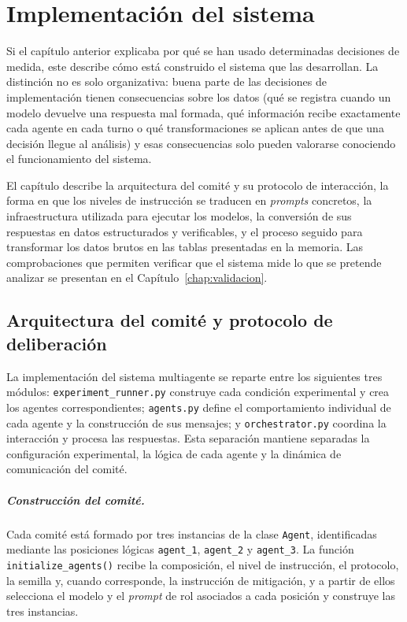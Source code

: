 
\chapter{Implementación del sistema}
\label{chap:implementacion}

Si el capítulo anterior explicaba por qué se han usado determinadas decisiones de medida, este describe cómo está construido el sistema que las desarrollan. La distinción no es solo organizativa: buena parte de las decisiones de implementación tienen consecuencias sobre los datos (qué se registra cuando un modelo devuelve una respuesta mal formada, qué información recibe exactamente cada agente en cada turno o qué transformaciones se aplican antes de que una decisión llegue al análisis) y esas consecuencias solo pueden valorarse conociendo el funcionamiento del sistema.

El capítulo describe la arquitectura del comité y su protocolo de interacción, la forma en que los niveles de instrucción se traducen en \textit{prompts} concretos, la infraestructura utilizada para ejecutar los modelos, la conversión de sus respuestas en datos estructurados y verificables, y el proceso seguido para transformar los datos brutos en las tablas presentadas en la memoria. Las comprobaciones que permiten verificar que el sistema mide lo que se pretende analizar se presentan en el Capítulo~\ref{chap:validacion}.

\section{Arquitectura del comité y protocolo de deliberación}
\label{sec:arquitectura_comite}

La implementación del sistema multiagente se reparte entre los siguientes tres módulos: \texttt{experiment\_runner.py} construye cada condición experimental y crea los agentes correspondientes; \texttt{agents.py} define el comportamiento individual de cada agente y la construcción de sus mensajes; y \texttt{orchestrator.py} coordina la interacción y procesa las respuestas. Esta separación mantiene separadas la configuración experimental, la lógica de cada agente y la dinámica de comunicación del comité.

\paragraph{Construcción del comité.}
Cada comité está formado por tres instancias de la clase \texttt{Agent}, identificadas mediante las posiciones lógicas \texttt{agent\_1}, \texttt{agent\_2} y \texttt{agent\_3}. La función \texttt{initialize\_agents()} recibe la composición, el nivel de instrucción, el protocolo, la semilla y, cuando corresponde, la instrucción de mitigación, y a partir de ellos selecciona el modelo y el \textit{prompt} de rol asociados a cada posición y construye las tres instancias.

